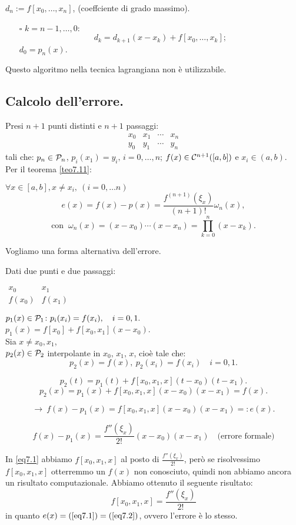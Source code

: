 $d_n := f[x_0, \ldots, x_{n}]$, (coeffciente di grado massimo).
\begin{itemize}
\item[$\square$] $k = n-1, \ldots, 0$:
\[
d_k = d_{k+1}(x-x_k) + f[x_0,\ldots, x_k];
\]
$d_0 = p_n(x)$.
\end{itemize}

Questo algoritmo nella tecnica lagrangiana non è utilizzabile.

\subsection{Calcolo dell'errore.}
Presi $n+1$ punti distinti e $n+1$ passaggi:
\[\begin{array}{cccc}
x_0 & x_1 & \cdots  & x_n\\
y_0 & y_1 & \cdots  & y_n
\end{array}\]
tali che: $p_n \in \mathcal{P}_n$, $p_i(x_1) = y_i, \, i = 0,\ldots,n$; $f(x) \in
\mathcal{C}^{n+1}([a,b])$ e $x_i \in (a,b)$. Per il teorema \ref{teo7.11}:

$\forall x \in [a,b], x \neq x_i,\ (i = 0, \ldots n)$
\[
e(x) = f(x)-p(x) = \frac{f^{(n+1)}(\xi_x)}{(n+1)!}\omega_n(x),
\]
\[\textrm{con }\ \omega_n(x) = (x-x_0)\cdots(x-x_n) = \prod_{k=0}^n(x-x_k).\]

Vogliamo una forma alternativa dell'errore.
\begin{exe} Dati due punti e due passaggi:
\begin{flushleft}$\begin{array}{cc}
x_0 & x_1 \\
f(x_0) & f(x_1)
\end{array}$\end{flushleft}
$p_1(x) \in \mathcal{P}_1 \colon p_i(x_i) = f(x_i), \quad i = 0,1.$\\
$p_1(x) = f[x_0] + f[x_0,x_1](x-x_0)$.\\

Sia $x \neq x_0, x_1$,\\
$p_2(x) \in \mathcal{P}_2$ interpolante in $x_0,\, x_1,\, x$, cioè tale che:
\[p_2(x) = f(x), \ p_2(x_i) = f(x_i) \quad i = 0,1.\]

\[p_2(t) = p_1(t) + f[x_0,x_1,x](t-x_0)(t-x_1).\]
\[p_2(x) = p_1(x) + f[x_0,x_1,x](x-x_0)(x-x_1) = f(x).\]

\begin{equation}\label{eq7.1}
\longrightarrow \ f(x) - p_1(x) = f[x_0,x_1,x](x-x_0)(x-x_1) =: e(x).
\end{equation}

\begin{equation}\label{eq7.2}
f(x) - p_1(x) = \frac{f''(\xi_x)}{2!}(x-x_0)(x-x_1) \quad \textrm{(errore
formale)}
\end{equation}

In \ref{eq7.1} abbiamo $f[x_0,x_1,x]$ al posto di $\frac{f''(\xi_x)}{2!}$,
però se risolvessimo $f[x_0,x_1,x]$ otterremmo un $f(x)$ non conosciuto,
quindi non abbiamo ancora un risultato computazionale. Abbiamo ottenuto il
seguente risultato:
\[f[x_0,x_1,x] = \frac{f''(\xi_x)}{2!}\]
in quanto $e(x) = (\ref{eq7.1}) = (\ref{eq7.2})$, ovvero l'errore è lo stesso.
\end{exe}

